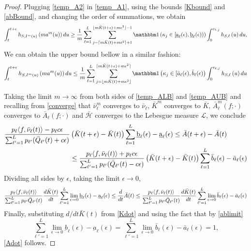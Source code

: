 \documentclass{article}
\theoremstyle{definition}
\numberwithin{equation}{section}
\begin{document}
\begin{proof}
Plugging \eqref{temp_A2} in \eqref{temp_A1}, using the bounds \eqref{Kbound} and \eqref{abBound}, and changing the order of summations, we obtain
\begin{equation}\label{temp_ALB}
  \int_{t}^{t+\epsilon} h_{S,\class^m(u)}\left(m\age^m(u)\right)  du
\geq \frac{1}{m}\sum_{\ell=1}^{L} \sum_{j=\lceil m\bar K(t)+ m\epsilon^2\rceil+1}^{\lfloor m \bar K(t+\epsilon)+ m\epsilon^2\rfloor -1} \indic{\selector_j\in[\underbar a_\ell(\epsilon),\underbar b_\ell(\epsilon))} \int_{0}^{v_{\ell,j}} h_{S,\ell}\left(u\right) du,
\end{equation}\label{temp_AUB}
We can obtain the upper bound bellow in a similar fashion:
\begin{equation}
\int_{t}^{t+\epsilon} h_{S,\class^m(u)}\left(m\age^m(u)\right)  du
\leq \frac{1}{m} \sum_{\ell=1}^{L} \sum_{j=\lfloor m\bar K(t)+ m\epsilon^2\rfloor}^{\lceil m \bar K(t+\epsilon)+ m\epsilon^2\rceil} \indic{\selector_j\in[\bar a_\ell(\epsilon),\bar b_\ell(\epsilon)}\int_{0}^{v_{\ell,j}} h_{S,\ell}\left(u\right) du
\end{equation}


Taking the limit $m\to\infty$ from both sides of \eqref{temp_ALB} and \eqref{temp_AUB} and recalling from \eqref{converge} that $\bar\nu^m_\ell$ converges to $\bar\nu_\ell$, $\bar K^m$ converges to $\bar K$, $\bar A^m_\ell(f;\cdot)$ converges to $\bar A_\ell(f;\cdot)$ and $\bar{\mathcal{H}}$ converges to the Lebesgue measure $\mathcal{L}$, we conclude
\begin{align}
  \frac{p_\ell \langle f,\bar{\nu}_\ell(t)\rangle-p_\ell c \epsilon}{\sum_{\ell'=1}^L p_{\ell'}(\bar {Q}_{\ell'}(t)+c\epsilon)}&\left(\bar K(t+\epsilon)-\bar K(t)\right)
\sum_{\ell=1}^{L}\underbar b_\ell(\epsilon)-\underbar a_\ell(\epsilon) \leq \bar A(t+\epsilon)-\bar A(t) \notag\\
&\leq \frac{p_\ell \langle f,\bar{\nu}_\ell(t)\rangle+p_\ell c \epsilon}{\sum_{\ell'=1}^L p_{\ell'}(\bar {Q}_{\ell'}(t)-c\epsilon)}\left(\bar K(t+\epsilon)-\bar K(t)\right)
\sum_{\ell=1}^{L}\bar b_\ell(\epsilon)-\bar a_\ell(\epsilon)
\end{align}
Dividing all sides by $\epsilon$, taking the limit $\epsilon\to 0$,
\[
\frac{p_\ell \langle f,\bar{\nu}_\ell(t)\rangle }{\sum_{\ell'=1}^L p_{\ell'}\bar {Q}_{\ell'}(t)}\frac{d\bar K(t)}{dt}
\sum_{\ell'=1}^{L}\lim_{\epsilon\to0}\underbar b_\ell(\epsilon)-\underbar a_\ell(\epsilon)\leq \frac{d}{dt}\bar A(t) \leq \frac{p_\ell \langle f,\bar{\nu}_\ell(t)\rangle }{\sum_{\ell'=1}^L p_{\ell'}\bar {Q}_{\ell'}(t)}\frac{d\bar K(t)}{dt}
\sum_{\ell'=1}^{L}\lim_{\epsilon\to 0}\bar b_\ell(\epsilon)-\bar a_\ell(\epsilon)
\]
Finally, substituting $d/dt \bar K(t)$ from \eqref{Kdot} and using the fact that by \eqref{ablimit}
\[
\sum_{\ell'=1}^{L}\lim_{\epsilon\to0}\underbar b_\ell(\epsilon)-\underbar a_\ell(\epsilon)=\sum_{\ell'=1}^{L}\lim_{\epsilon\to0}\bar b_\ell(\epsilon)-\bar a_\ell(\epsilon)=1,
\]
\eqref{Adot} follows.
\end{proof}
\end{document}
